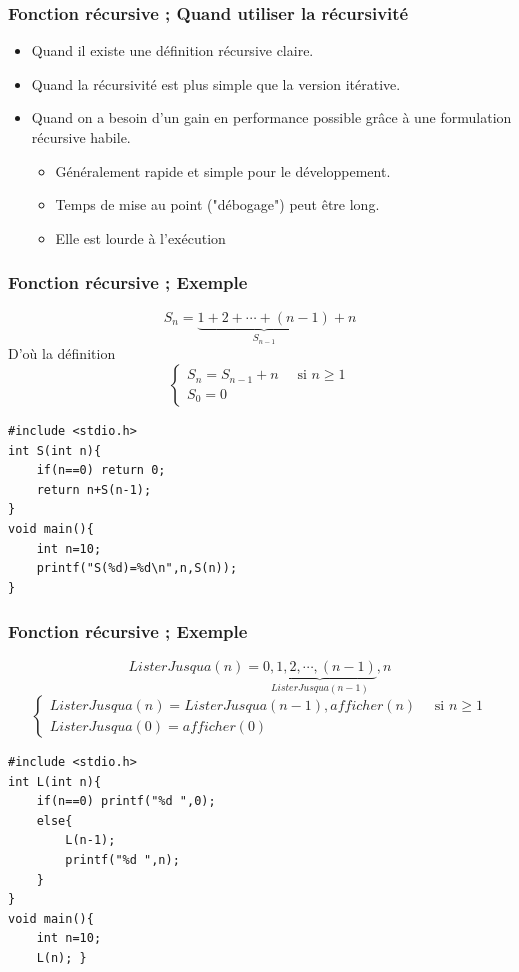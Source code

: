 \documentclass{beamer}
\begin{document}

\begin{frame}[fragile]
\frametitle{Fonction récursive ; Quand utiliser la récursivité }

\begin{itemize}
\item Quand il existe une définition récursive claire. 
\item Quand la récursivité est plus simple que la version itérative. 
\item Quand on a besoin d'un gain en performance possible grâce à une formulation récursive habile. 
\begin{itemize}
\item Généralement rapide et simple pour le développement. 
\item Temps de mise au point ("débogage") peut être long. 
\item Elle est lourde à l'exécution
\end{itemize}
\end{itemize}
\end{frame}


\begin{frame}[fragile]
\frametitle{Fonction récursive ; Exemple}

\[S_n = \underbrace{1+2+\cdots + (n-1)}_{S_{n-1}}+n\]
D'où la définition
\[\left\{\begin{array}{l}
S_n=S_{n-1}+n\quad\mbox{ si }n\geq 1\\
S_0=0
\end{array}\right.\]
\begin{verbatim}  
#include <stdio.h>
int S(int n){ 
    if(n==0) return 0;
    return n+S(n-1);
} 
void main(){ 
    int n=10; 
    printf("S(%d)=%d\n",n,S(n)); 
}
\end{verbatim}


\end{frame}


\begin{frame}[fragile]
\frametitle{Fonction récursive ; Exemple}
\[ListerJusqua(n) = \underbrace{0, 1, 2, \cdots ,  (n-1)}_{ListerJusqua(n-1)}, n\]
\[\left\{\begin{array}{l}
ListerJusqua(n) =ListerJusqua(n-1) , afficher(n)\quad\mbox{ si }n\geq 1\\
ListerJusqua(0) =  afficher(0)
\end{array}\right.\]
\begin{verbatim}  
#include <stdio.h>
int L(int n){ 
    if(n==0) printf("%d ",0);
    else{
        L(n-1);
        printf("%d ",n);
    }
} 
void main(){ 
    int n=10; 
    L(n); }
\end{verbatim}


\end{frame}
\end{document}

